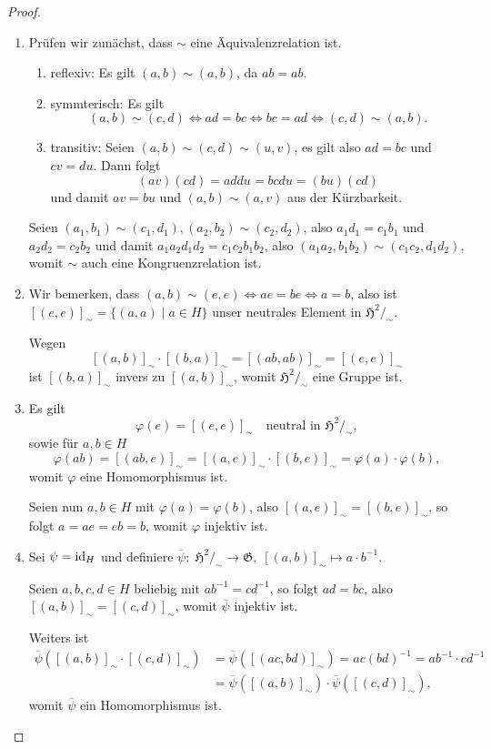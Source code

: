 \begin{proof} {\ }
    \begin{enumerate}
        \item Prüfen wir zunächst, dass $\sim$ eine Äquivalenzrelation ist.
        \begin{enumerate}
            \item reflexiv: Es gilt $(a, b) \sim (a, b)$, da $a b = a b$.
            \item symmterisch: Es gilt
            $$ (a, b) \sim (c, d) \Leftrightarrow a d = b c \Leftrightarrow b c = a d \Leftrightarrow (c, d) \sim (a, b). $$
            \item transitiv: Seien $(a, b) \sim (c, d) \sim (u, v)$, es gilt also $ad = bc$ und $cv = du$. Dann folgt
            $$ (av)(cd) = addu = bcdu = (bu)(cd) $$
            und damit $av = bu$ und $(a, b) \sim (a, v)$ aus der Kürzbarkeit.
        \end{enumerate}
        Seien $(a_1, b_1) \sim (c_1, d_1), (a_2, b_2) \sim (c_2, d_2)$, also $a_1 d_1 = c_1 b_1$ und $a_2 d_2 = c_2 b_2$ und damit $a_1 a_2 d_1 d_2 = c_1 c_2 b_1 b_2$, also $(a_1 a_2, b_1 b_2) \sim (c_1 c_2, d_1 d_2)$, womit $\sim$ auch eine Kongruenzrelation ist.

        \item Wir bemerken, dass $(a, b) \sim (e, e) \Leftrightarrow ae = be \Leftrightarrow a = b$, also ist $[(e,e)]_\sim = \{ (a, a) \mid a \in H \}$ unser neutrales Element in $\mathfrak{H}^2 /_\sim$.
        
        Wegen
        $$ [(a,b)]_\sim \cdot [(b,a)]_\sim = [(ab, ab)]_\sim = [(e,e)]_\sim $$
        ist $[(b,a)]_\sim$ invers zu $[(a,b)]_\sim$, womit $\mathfrak{H}^2 /_\sim$ eine Gruppe ist.

        \item Es gilt
        $$ \varphi(e) = [(e,e)]_\sim \quad \textrm{neutral in } \mathfrak{H}^2 /_\sim, $$
        sowie für $a, b \in H$
        $$ \varphi(ab) = [(ab, e)]_\sim = [(a,e)]_\sim \cdot [(b,e)]_\sim = \varphi(a) \cdot \varphi(b), $$
        womit $\varphi$ eine Homomorphismus ist.

        Seien nun $a,b \in H$ mit $\varphi(a) = \varphi(b)$, also $[(a,e)]_\sim = [(b,e)]_\sim$, so folgt $a = ae = eb = b$, womit $\varphi$ injektiv ist.

        \item Sei \obda $\psi = \operatorname{id}_H$ und definiere $ \overline{\psi} :\; \mathfrak{H}^2 /_\sim \to \mathfrak{G}, \;[(a,b)]_\sim \mapsto a \cdot b^{-1} $.
        
        Seien $a,b,c,d \in H$ beliebig mit $a b^{-1} = c d^{-1}$, so folgt $ad = bc$, also $[(a,b)]_\sim = [(c,d)]_\sim$, womit $\overline{\psi}$ injektiv ist.

        Weiters ist
        \begin{align*}
            \overline{\psi}([(a,b)]_\sim \cdot [(c,d)]_\sim) &= \overline{\psi}([(ac,bd)]_\sim) = ac (bd)^{-1} = ab^{-1} \cdot cd^{-1} \\ &= \overline{\psi}([(a,b)]_\sim) \cdot \overline{\psi}([(c,d)]_\sim), 
        \end{align*}
        womit $\overline{\psi}$ ein Homomorphismus ist.
    \end{enumerate}
\end{proof}